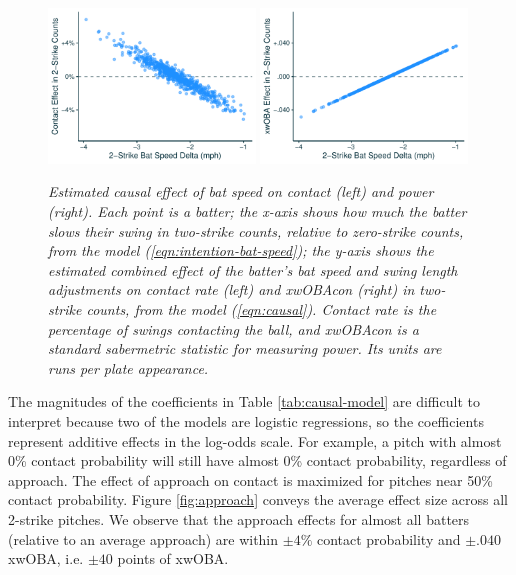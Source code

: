 \documentclass{article}
\begin{document}
      \begin{figure}
        \centering
        \includegraphics[width = 0.49\textwidth]{../../figures/bat_speed_contact.pdf}
        \includegraphics[width = 0.49\textwidth]{../../figures/bat_speed_power.pdf}
        \caption{\it Estimated causal effect of bat speed on contact (left) and power (right). Each point is a batter; the x-axis shows how much the batter slows their swing in two-strike counts, relative to zero-strike counts, from the model (\ref{eqn:intention-bat-speed}); the y-axis shows the estimated combined effect of the batter's bat speed and swing length adjustments on contact rate (left) and xwOBAcon (right) in two-strike counts, from the model (\ref{eqn:causal}). Contact rate is the percentage of swings contacting the ball, and xwOBAcon is a standard sabermetric statistic for measuring power. Its units are runs per plate appearance.}
        \label{fig:results-causal}
      \end{figure}

      The magnitudes of the coefficients in Table \ref{tab:causal-model} are difficult to interpret because two of the models are logistic regressions, so the coefficients represent additive effects in the log-odds scale. For example, a pitch with almost 0\% contact probability will still have almost 0\% contact probability, regardless of approach. The effect of approach on contact is maximized for pitches near 50\% contact probability. Figure \ref{fig:approach} conveys the average effect size across all 2-strike pitches. We observe that the approach effects for almost all batters (relative to an average approach) are within $\pm4\%$ contact probability and $\pm.040$ xwOBA, i.e. $\pm 40$ points of xwOBA.
\end{document}
